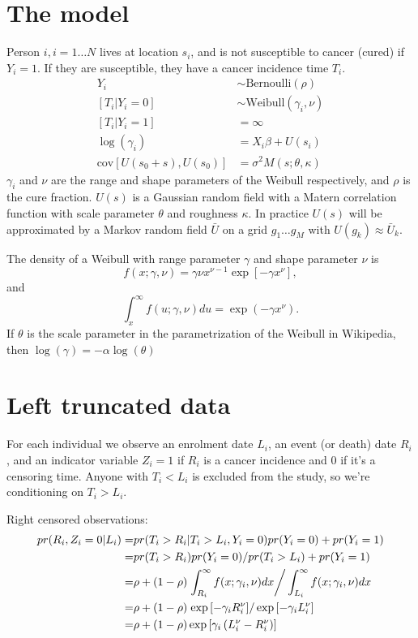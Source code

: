 \documentclass{article}
\begin{document}
\section{The model}
Person $i, i=1\ldots N$ lives at location $s_i$, and is not susceptible to cancer (cured) if $Y_i=1$.  If they are susceptible, they have a cancer incidence time $T_i$.
\begin{align*}
Y_i & \sim \text{Bernoulli}(\rho)\\
[T_i | Y_i = 0] &\sim \text{Weibull}(\gamma_i, \nu)\\
[T_i | Y_i = 1] & = \infty \\
\log(\gamma_i) &= X_i \beta + U(s_i)\\
\text{cov}[U(s_0 + s), U(s_0)] &= \sigma^2 M(s; \theta, \kappa) 
\end{align*}
$\gamma_i$ and $\nu$ are the range and shape parameters of the Weibull respectively, and $\rho$ is the cure fraction.  $U(s)$ is a Gaussian random field with a Matern correlation function with scale parameter $\theta$ and roughness $\kappa$.  In practice $U(s)$ will be approximated by a Markov random field $\bar U$ on a grid $g_1 \ldots g_M$ with $U(g_k) \approx \bar U_k$.



The density of a Weibull with range parameter $\gamma$ and shape parameter $\nu$ is 
\[
f(x;\gamma,\nu) =  \gamma \nu x^{\nu-1} \exp\left[-	\gamma x^\nu\right],
\]
and
\[
\int_x^\infty f(u;\gamma,\nu)du = \exp(-\gamma x^\nu).
\]
If $\theta$ is the scale parameter in the parametrization of the Weibull in Wikipedia, then 
$\log(\gamma) = -\alpha\log(\theta)$


\section{Left truncated data}
For each individual we observe an enrolment date $L_i$, an event (or death) date $R_i$, and an indicator variable $Z_i = 1$ if $R_i$ is a cancer incidence and 0 if it's a censoring time. Anyone with $T_i < L_i$ is excluded from the study, so we're conditioning on $T_i > L_i$.  

Right censored observations:
\begin{align*}
pr(R_i, Z_i=0 | L_i) =& pr(T_i > R_i | T_i > L_i, Y_i =0) pr(Y_i =0)  + pr(Y_i =1)\\
=&pr(T_i > R_i) pr(Y_i = 0)/pr(T_i > L_i) + pr(Y_i =1)\\
=& \rho + (1-\rho) \left. \int_{R_i}^\infty f(x;\gamma_i, \nu) dx \right/\int_{L_i}^\infty f(x;\gamma_i, \nu) dx  \\
= &  \rho + (1-\rho) \left. \exp\left[-\gamma_i R_i^\nu\right] \right/\exp\left[-\gamma_i L_i^\nu\right]\\
= &  \rho + (1-\rho) \exp\left[\gamma_i\left(L_i^\nu -R_i^\nu\right)\right] \\
\end{align*}
\end{document}

